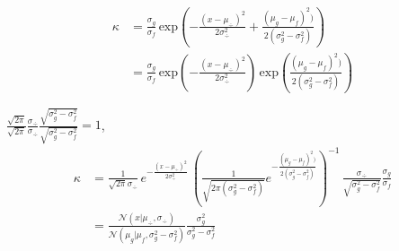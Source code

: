 \documentclass[a4paper,10pt]{book}
\newcommand{\N}{\mathcal{N}}
\theoremstyle{definition}
\newif\ifen
\newif\ifes
\newcommand{\en}[1]{\ifen#1\fi}
\newcommand{\es}[1]{\ifes#1\fi}
\begin{document}
\en{Returning to the original expression}
\begin{equation}
\begin{split}
 \kappa & = \frac{\sigma_g}{\sigma_f}  \, \text{exp}\left(- \frac{(x - \mu_{\div})^2}{2\sigma_{\div}^2} + \frac{(\mu_g - \mu_f)^2)}{2(\sigma_g^2 - \sigma_f^2)}  \right)\\[0.3cm]
 & = \frac{\sigma_g}{\sigma_f} \, \text{exp}\left({-\frac{(x - \mu_{\div})^2}{2\sigma_{\div}^2}}\right) \, \text{exp}\left({\frac{(\mu_g - \mu_f)^2)}{2(\sigma_g^2 - \sigma_f^2)}}\right)
\end{split}
\end{equation}

\en{Multiplying by} $\frac{\sqrt{2\pi}}{\sqrt{2\pi}}\frac{\sigma_{\div}}{\sigma_{\div}}\frac{\sqrt{\sigma_g^2 - \sigma_f^2}}{\sqrt{\sigma_g^2 - \sigma_f^2}}=1$,
\begin{equation}
\begin{split}
 \kappa & =  \frac{1}{\sqrt{2\pi}\sigma_{\div}} \, e^{-\frac{(x - \mu_{\div})^2}{2\sigma_{\div}^2}} \, \left( \frac
 {1}{\sqrt{2\pi(\sigma_g^2 - \sigma_f^2)} } e^{-\frac{(\mu_g - \mu_f)^2)}{2(\sigma_g^2 - \sigma_f^2)}} \right)^{-1} \, \frac{\sigma_{\div}}{\sqrt{\sigma_g^2 - \sigma_f^2}}\frac{\sigma_g}{\sigma_f}\\[0.3cm]
 & = \frac{\N\left(x| \mu_{\div},\sigma_{\div}\right)}{\N\left(\mu_g|\mu_f,\sigma_g^2-\sigma_f^2\right)} \frac{\sigma_g^2}{\sigma_g^2 - \sigma_f^2}
\end{split}
\end{equation}
\end{document}

